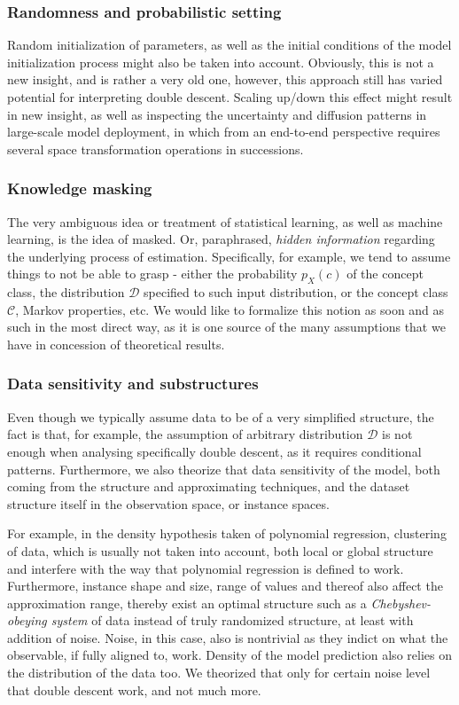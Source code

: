 \subsubsection{Randomness and probabilistic setting}
Random initialization of parameters, as well as the initial conditions of the model initialization process might also be taken into account. Obviously, this is not a new insight, and is rather a very old one, however, this approach still has varied potential for interpreting double descent. Scaling up/down this effect might result in new insight, as well as inspecting the uncertainty and diffusion patterns in large-scale model deployment, in which from an end-to-end perspective requires several space transformation operations in successions.
\subsubsection{Knowledge masking}
The very ambiguous idea or treatment of statistical learning, as well as machine learning, is the idea of masked. Or, paraphrased, \textit{hidden information} regarding the underlying process of estimation. Specifically, for example, we tend to assume things to not be able to grasp - either the probability $p_{X}(c)$ of the concept class, the distribution $\mathcal{D}$ specified to such input distribution, or the concept class $\mathcal{C}$, Markov properties, etc. We would like to formalize this notion as soon and as such in the most direct way, as it is one source of the many assumptions that we have in concession of theoretical results. 

\subsubsection{Data sensitivity and substructures}

Even though we typically assume data to be of a very simplified structure, the fact is that, for example, the assumption of arbitrary distribution $\mathcal{D}$ is not enough when analysing specifically double descent, as it requires conditional patterns. Furthermore, we also theorize that data sensitivity of the model, both coming from the structure and approximating techniques, and the dataset structure itself in the observation space, or instance spaces. 

For example, in the density hypothesis taken of polynomial regression, clustering of data, which is usually not taken into account, both local or global structure and interfere with the way that polynomial regression is defined to work. Furthermore, instance shape and size, range of values and thereof also affect the approximation range, thereby exist an optimal structure such as a \textit{Chebyshev-obeying system} of data instead of truly randomized structure, at least with addition of noise. Noise, in this case, also is nontrivial as they indict on what the observable, if fully aligned to, work. Density of the model prediction also relies on the distribution of the data too. We theorized that only for certain noise level that double descent work, and not much more. 

